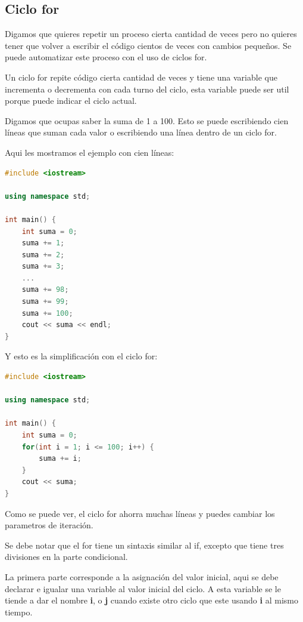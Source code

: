\documentclass{article}
\begin{document}
\subsection{Ciclo for}

Digamos que quieres repetir un proceso cierta cantidad de veces pero no quieres tener que volver a escribir el código cientos de veces con cambios pequeños. Se puede automatizar este proceso con el uso de ciclos for.

Un ciclo for repite código cierta cantidad de veces y tiene una variable que incrementa o decrementa con cada turno del ciclo, esta variable puede ser util porque puede indicar el ciclo actual.

Digamos que ocupas saber la suma de 1 a 100. Esto se puede escribiendo cien líneas que suman cada valor o escribiendo una línea dentro de un ciclo for.

Aqui les mostramos el ejemplo con cien líneas:

\begin{lstlisting}[language=C++, caption=Suma línea por línea]
#include <iostream>

using namespace std;

int main() {
    int suma = 0;
    suma += 1;
    suma += 2;
    suma += 3;
    ...
    suma += 98;
    suma += 99;
    suma += 100;
    cout << suma << endl;
}
\end{lstlisting}

Y esto es la simplificación con el ciclo for:

\begin{lstlisting}[language=C++, caption=Suma con ciclo for]
#include <iostream>

using namespace std;

int main() {
    int suma = 0;
    for(int i = 1; i <= 100; i++) {
        suma += i;
    }
    cout << suma;
}
\end{lstlisting}

Como se puede ver, el ciclo for ahorra muchas líneas y puedes cambiar los parametros de iteración.

Se debe notar que el for tiene un sintaxis similar al if, excepto que tiene tres divisiones en la parte condicional.

La primera parte corresponde a la asignación del valor inicial, aqui se debe declarar e igualar una variable al valor inicial del ciclo. A esta variable se le tiende a dar el nombre \textbf{i}, o \textbf{j} cuando existe otro ciclo que este usando \textbf{i} al mismo tiempo.
\end{document}
